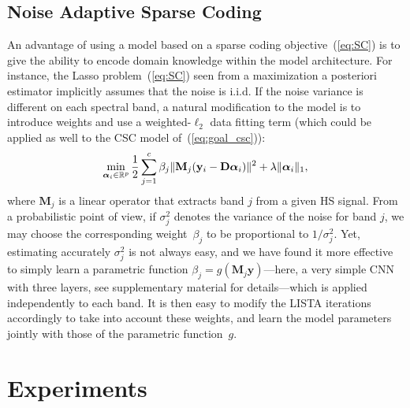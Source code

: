 \subsection{Noise Adaptive Sparse Coding}
\label{subsec:adaptive}

An advantage of using a model based on a sparse coding objective~(\ref{eq:SC}) is to give the ability to encode domain knowledge within the model architecture. 
For instance, the Lasso problem~(\ref{eq:SC}) seen from a maximization a posteriori estimator implicitly assumes that the noise is i.i.d.
If the noise variance is different on each spectral band, a natural modification to the 
model is to introduce weights and use a weighted-$\ell_2$ data fitting term (which could be applied as well to the CSC model of~(\ref{eq:goal_csc})):
\begin{equation}
\label{eq:goal2}
\min_{\boldsymbol \alpha_i \in \mathbb R^p} \frac{1}{2} \sum_{j=1}^c \beta_j \| \mathbf{M}_j ( \mathbf{y}_i - \mathbf{D} {\boldsymbol \alpha}_i) \|^2 + \lambda \| {\boldsymbol \alpha}_i \|_1,
\end{equation}
where $\mathbf{M}_j$ is a linear operator that extracts band $j$ from a given HS signal. 
From a probabilistic point of view, if $\sigma_j^2$ denotes the variance of the noise for band $j$, we may choose the corresponding weight~$\beta_j$ to be proportional to $1/\sigma_j^2$.
Yet, estimating accurately $\sigma_j^2$ is not always easy, and we have found it more effective to simply learn a parametric function $\beta_j = g (\mathbf{M}_j  \mathbf{y})$---here, a very simple CNN with three layers, see supplementary material for details---which is applied independently to each band.
It is then easy to modify the LISTA iterations accordingly to take into account these weights, and learn the model parameters jointly with those of the parametric function~$g$.

\section{Experiments}

